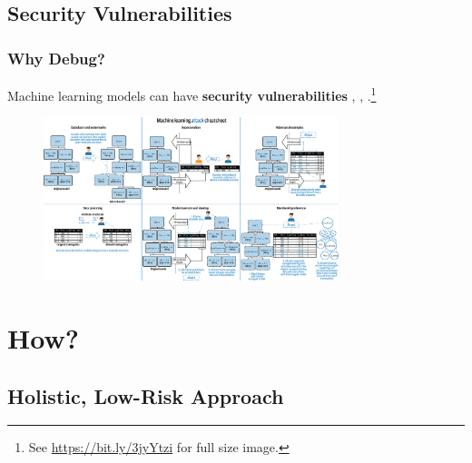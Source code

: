 \documentclass[11pt,
               aspectratio=169,
               hyperref={colorlinks}
               ]{beamer}
\begin{document}
		\subsection{Security Vulnerabilities}
			\begin{frame}[t]
		
				\frametitle{Why Debug?}
		
				\footnotesize{Machine learning models can have \textbf{security vulnerabilities} \cite{security_of_ml}, \cite{membership_inference}, \cite{model_stealing}}.\footnote{\tiny{See \url{https://bit.ly/3jyYtzi} for full size image.}}
				\begin{figure}[]
					\begin{center}
						\includegraphics[height=135pt]{img/cheatsheet.png}
					\end{center}
				\end{figure}	
				\vspace{-17pt}
				\normalsize
		
			\end{frame}

	\section{How?}

		\subsection{Holistic, Low-Risk Approach}
	
\end{document}
